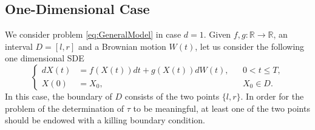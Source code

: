 \subsection{One-Dimensional Case}
We consider problem \eqref{eq:GeneralModel} in case $d = 1$. Given $f,g \colon \mathbb{R} \rightarrow \mathbb{R}$, an interval $D = \left[l,r\right]$ and a Brownian motion $W(t)$, let us consider the following one dimensional SDE
\begin{equation}\label{eq:OneDModel}
\left \{
\begin{aligned}
	dX(t) &= f(X(t)) dt + g(X(t))dW(t), && 0 < t \leq T, \\
	X(0)  &= X_0, && X_0 \in D.
\end{aligned} \right .
\end{equation}
In this case, the boundary of $D$ consists of the two points $\{l,r\}$. In order for the problem of the determination of $\tau$ to be meaningful, at least one of the two points should be endowed with a killing boundary condition. 





